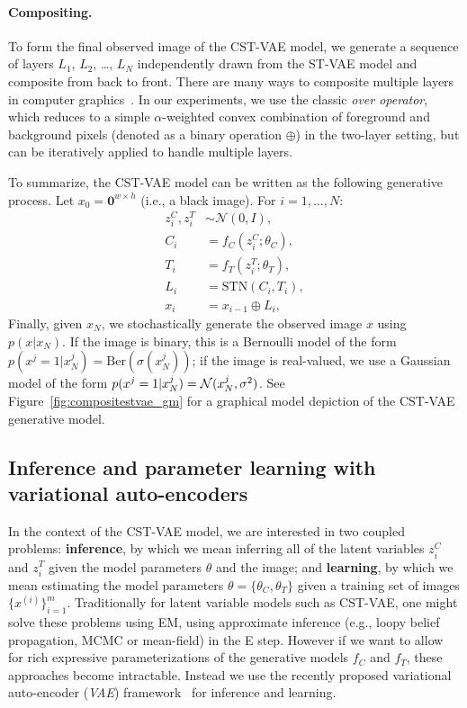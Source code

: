 \paragraph{Compositing.}
To form the final observed image of the CST-VAE model, we generate a sequence of layers $L_1$, $L_2$, \dots, $L_N$
independently drawn from the ST-VAE model and composite from
back to front.
There are many  ways to composite multiple layers in computer graphics~\citep{porter1984compositing}.
In our experiments, we use  the classic \emph{over operator}, which reduces to a simple $\alpha$-weighted
convex combination of foreground and background pixels (denoted as a  binary  operation $\oplus$)
in the two-layer setting, but can be iteratively applied
to handle multiple layers. %

 

To summarize, the CST-VAE model can be written as the following generative process.  Let $x_0=\mathbf{0}^{w\times h}$ (i.e., a black image).   For $i=1,\dots,N$:\vspace{-2mm}
\begin{align*}
z_i^C, z_i^T  &\sim \mathcal{N}(0, I), \\
C_i &= f_C(z_i^C; \theta_C), \\
T_i &= f_T(z_i^T; \theta_T), \\
L_i &= \mbox{STN}(C_i, T_i), \\
x_i &= x_{i-1} \oplus L_i,
\end{align*}
Finally, given $x_N$, we stochastically generate the observed image
$x$ using $p(x|x_N)$.
If the image is binary, this is a Bernoulli
model of the form $p(x^j=1|x_N^j) = \mbox{Ber}(\sigma(x_N^j))$;
if the image is real-valued, we use a Gaussian model of the form
$p(x^j=1|x_N^j) = {\cal N}(x_N^j, \sigma^2)$.
See Figure~\ref{fig:compositestvae_gm} for
 a graphical model depiction of the CST-VAE generative model.




\subsection{Inference and parameter learning with variational auto-encoders}

In the context of the CST-VAE model, we are  interested in two coupled
problems: 
\textbf{inference}, by which we mean inferring all of the latent
variables $z^C_i$ and $z^T_i$ given the model parameters $\theta$
and the image;
and 
 \textbf{learning}, by which we mean estimating the model parameters
$\theta=\{\theta_C,\theta_T\}$ given a training set of images
$\{x^{(i)}\}_{i=1}^m$.
Traditionally for latent
variable models such as CST-VAE, one might solve these problems using
EM,
using approximate inference (e.g., loopy
belief propagation, MCMC or mean-field)
in the E step.
 However if we want to allow for
rich expressive parameterizations of the generative models $f_C$ and
$f_T$, these 
approaches become intractable.  Instead we use the recently proposed
variational auto-encoder (\emph{VAE}) framework~\citep{Kingma2014} for
inference and learning.


